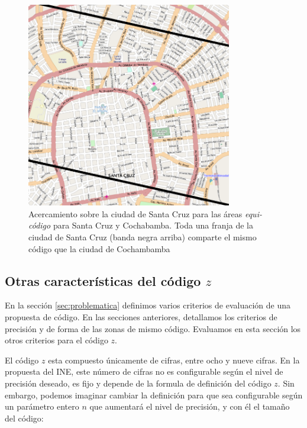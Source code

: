 \documentclass[letterpaper]{article}
\begin{document}
\begin{figure}[p]
    \centering
    \includegraphics[width=0.8\textwidth]{resultados/area_equi_codigo_santacruz_cochabamba.png}
    \caption{Acercamiento sobre la ciudad de Santa Cruz para las áreas \emph{equi-código} para Santa Cruz y Cochabamba. Toda una franja de la ciudad de Santa Cruz (banda negra arriba) comparte el mismo código que la ciudad de Cochambamba}
    \label{fig:areas_por_capital_santacruz_cochabamba}
\end{figure}

\subsection{Otras características del código \(z\)}
\label{sec:otras_ine}

En la sección \ref{sec:problematica} definimos varios criterios de 
evaluación de una propuesta de código. En las secciones anteriores, 
detallamos los criterios de precisión y de forma de las zonas de mismo 
código. Evaluamos en esta sección los otros criterios para el código 
\(z\).

El código \(z\) esta compuesto únicamente de cifras, entre ocho y 
nueve cifras. En la propuesta del INE, este número de cifras no es configurable según el nivel 
de precisión deseado, es fijo y depende de la formula de definición 
del código \(z\). Sin embargo, podemos imaginar cambiar la definición 
para que sea configurable según un parámetro entero \(n\) que 
aumentará el nivel de precisión, y con él el tamaño del código:
\end{document}
